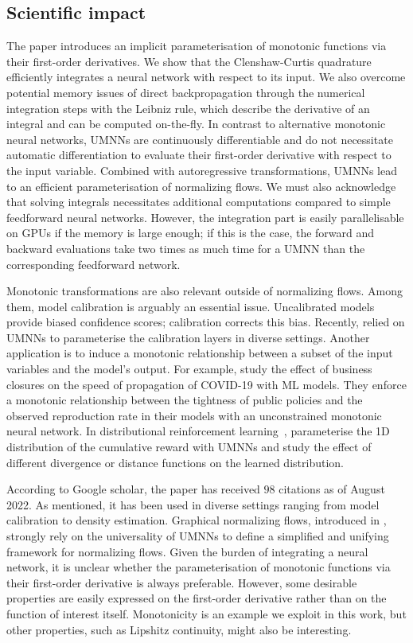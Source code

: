 \subsection{Scientific impact}
The paper introduces an implicit parameterisation of monotonic functions via their first-order derivatives. We show that the Clenshaw-Curtis quadrature efficiently integrates a neural network with respect to its input. We also overcome potential memory issues of direct backpropagation through the numerical integration steps with the Leibniz rule, which describe the derivative of an integral and can be computed on-the-fly. In contrast to alternative monotonic neural networks, UMNNs are continuously differentiable and do not necessitate automatic differentiation to evaluate their first-order derivative with respect to the input variable. Combined with autoregressive transformations, UMNNs lead to an efficient parameterisation of normalizing flows. We must also acknowledge that solving integrals necessitates additional computations compared to simple feedforward neural networks. However, the integration part is easily parallelisable on GPUs if the memory is large enough; if this is the case, the forward and backward evaluations take two times as much time for a UMNN than the corresponding feedforward network.

Monotonic transformations are also relevant outside of normalizing flows. Among them, model calibration is arguably an essential issue. Uncalibrated models provide biased confidence scores; calibration corrects this bias. Recently, \citet{gruber2022trustworthy, deycalibrated, rahimi2020intra} relied on UMNNs to parameterise the calibration layers in diverse settings. Another application is to induce a monotonic relationship between a subset of the input variables and the model's output. For example, \citet{yurk2021county} study the effect of business closures on the speed of propagation of COVID-19 with ML models. They enforce a monotonic relationship between the tightness of public policies and the observed reproduction rate in their models with an unconstrained monotonic neural network. In distributional reinforcement learning~\citep{dabney2018distributional}, \citet{theate2021distributional} parameterise the 1D distribution of the cumulative reward with UMNNs and study the effect of different divergence or distance functions on the learned distribution.

According to Google scholar, the paper has received $98$ citations as of August 2022. As mentioned, it has been used in diverse settings ranging from model calibration to density estimation. Graphical normalizing flows, introduced in , strongly rely on the universality of UMNNs to define a simplified and unifying framework for normalizing flows. Given the burden of integrating a neural network, it is unclear whether the parameterisation of monotonic functions via their first-order derivative is always preferable. However, some desirable properties are easily expressed on the first-order derivative rather than on the function of interest itself. Monotonicity is an example we exploit in this work, but other properties, such as Lipshitz continuity, might also be interesting.


